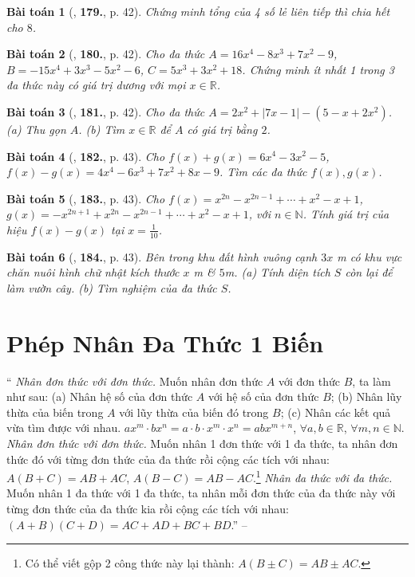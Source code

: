 \documentclass{article}
\numberwithin{equation}{section}
\newtheorem{baitoan}{Bài toán}
\begin{document}
\begin{baitoan}[\cite{Tuyen_Toan_7}, \textbf{179.}, p. 42]
	Chứng minh tổng của 4 số lẻ liên tiếp thì chia hết cho $8$.
\end{baitoan}

\begin{baitoan}[\cite{Tuyen_Toan_7}, \textbf{180.}, p. 42]
	Cho đa thức $A = 16x^4 - 8x^3 + 7x^2 - 9$, $B = -15x^4 + 3x^3 - 5x^2 - 6$, $C = 5x^3 + 3x^2 + 18$. Chứng minh ít nhất 1 trong 3 đa thức này có giá trị dương với mọi $x\in\mathbb{R}$.
\end{baitoan}

\begin{baitoan}[\cite{Tuyen_Toan_7}, \textbf{181.}, p. 42]
	Cho đa thức $A = 2x^2 + |7x - 1| - (5 - x + 2x^2)$. (a) Thu gọn $A$. (b) Tìm $x\in\mathbb{R}$ để $A$ có giá trị bằng $2$.
\end{baitoan}

\begin{baitoan}[\cite{Tuyen_Toan_7}, \textbf{182.}, p. 43]
	Cho $f(x) + g(x) = 6x^4 - 3x^2 - 5$, $f(x) - g(x) = 4x^4 - 6x^3 + 7x^2 + 8x - 9$. Tìm các đa thức $f(x),g(x)$.
\end{baitoan}

\begin{baitoan}[\cite{Tuyen_Toan_7}, \textbf{183.}, p. 43]
	Cho $f(x) = x^{2n} - x^{2n-1} + \cdots + x^2 - x + 1$, $g(x) = -x^{2n+1} + x^{2n} - x^{2n-1} + \cdots + x^2 - x + 1$, với $n\in\mathbb{N}$. Tính giá trị của hiệu $f(x) - g(x)$ tại $x = \frac{1}{10}$.
\end{baitoan}

\begin{baitoan}[\cite{Tuyen_Toan_7}, \textbf{184.}, p. 43]
	Bên trong khu đất hình vuông cạnh $3x$ \emph{m} có khu vực chăn nuôi hình chữ nhật kích thước $x$ \emph{m} \& $5$\emph{m}. (a) Tính diện tích $S$ còn lại để làm vườn cây. (b) Tìm nghiệm của đa thức $S$.
\end{baitoan}


\section{Phép Nhân Đa Thức 1 Biến}
`` \textit{Nhân đơn thức với đơn thức.} Muốn nhân đơn thức $A$ với đơn thức $B$, ta làm như sau: (a) Nhân hệ số của đơn thức $A$ với hệ số của đơn thức $B$; (b) Nhân lũy thừa của biến trong $A$ với lũy thừa của biến đó trong $B$; (c) Nhân các kết quả vừa tìm được với nhau. $ax^m\cdot bx^n = a\cdot b\cdot x^m\cdot x^n = abx^{m+n}$, $\forall a,b\in\mathbb{R}$, $\forall m,n\in\mathbb{N}$.  \textit{Nhân đơn thức với đơn thức.} Muốn nhân 1 đơn thức với 1 đa thức, ta nhân đơn thức đó với từng đơn thức của đa thức rồi cộng các tích với nhau: $A(B + C) = AB + AC$, $A(B - C) = AB - AC$.\footnote{Có thể viết gộp 2 công thức này lại thành: $A(B\pm C) = AB\pm AC$.}  \textit{Nhân đa thức với đa thức.} Muốn nhân 1 đa thức với 1 đa thức, ta nhân mỗi đơn thức của đa thức này với từng đơn thức của đa thức kia rồi cộng các tích với nhau: $(A + B)(C + D) = AC + AD + BC + BD$.'' -- \cite[Chap. VI, \S4, pp. 47--48]{SBT_Toan_7_Canh_Dieu_tap_2}
\end{document}
